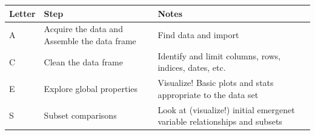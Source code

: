 \documentclass[
]{book}
\begin{document}
\begin{longtable}[]{@{}lll@{}}
\toprule
\begin{minipage}[b]{0.26\columnwidth}\raggedright
Letter\strut
\end{minipage} & \begin{minipage}[b]{0.17\columnwidth}\raggedright
Step\strut
\end{minipage} & \begin{minipage}[b]{0.48\columnwidth}\raggedright
Notes\strut
\end{minipage}\tabularnewline
\midrule
\endhead
\begin{minipage}[t]{0.26\columnwidth}\raggedright
A\strut
\end{minipage} & \begin{minipage}[t]{0.17\columnwidth}\raggedright
Acquire the data and Assemble the data frame\strut
\end{minipage} & \begin{minipage}[t]{0.48\columnwidth}\raggedright
Find data and import\strut
\end{minipage}\tabularnewline
\begin{minipage}[t]{0.26\columnwidth}\raggedright
C\strut
\end{minipage} & \begin{minipage}[t]{0.17\columnwidth}\raggedright
Clean the data frame\strut
\end{minipage} & \begin{minipage}[t]{0.48\columnwidth}\raggedright
Identify and limit columns, rows, indices, dates, etc.\strut
\end{minipage}\tabularnewline
\begin{minipage}[t]{0.26\columnwidth}\raggedright
E\strut
\end{minipage} & \begin{minipage}[t]{0.17\columnwidth}\raggedright
Explore global properties\strut
\end{minipage} & \begin{minipage}[t]{0.48\columnwidth}\raggedright
Visualize! Basic plots and stats appropriate to the data set\strut
\end{minipage}\tabularnewline
\begin{minipage}[t]{0.26\columnwidth}\raggedright
S\strut
\end{minipage} & \begin{minipage}[t]{0.17\columnwidth}\raggedright
Subset comparisons\strut
\end{minipage} & \begin{minipage}[t]{0.48\columnwidth}\raggedright
Look at (visualize!) initial emergenet variable relationships and subsets\strut
\end{minipage}\tabularnewline
\bottomrule
\end{longtable}
\end{document}
